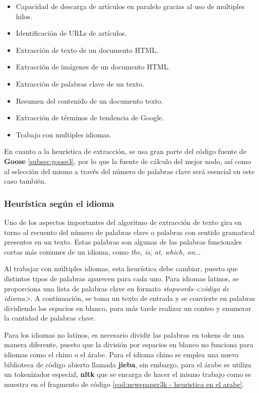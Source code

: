 \begin{itemize}
  \item Capacidad de descarga de artículos en paralelo gracias al uso de multiples hilos.
  \item Identificación de URLs de artículos.
  \item Extracción de texto de un documento HTML.
  \item Extracción de imágenes de un documento HTML.
  \item Extracción de palabras clave de un texto.
  \item Resumen del contenido de un documento texto.
  \item Extracción de términos de tendencia de Google.
  \item Trabajo con multiples idiomas.
\end{itemize}

En cuanto a la heurística de extracción, se usa gran parte del código fuente de \textbf{Goose} 
\ref{subsec:goose3}, por lo que la fuente de cálculo del mejor nodo, así como al selección del mismo a 
través del número de palabras clave será esencial en este caso también.

\subsubsection{Heurística según el idioma}
\label{subsubsec:heuristica segun el idioma}

Uno de los aspectos importantes del algoritmo de extracción de texto gira en torno al recuento del número 
de palabras clave o palabras con sentido gramatical presentes en un texto. Estas palabras son algunas de 
las palabras funcionales cortas más comunes de un idioma, como \emph{the, is, at, which, on}... 

Al trabajar con múltiples idiomas, esta heurística debe cambiar, puesto que distintos tipos de palabras
aparecen para cada uno. Para idiomas latinos, se proporciona una lista de palabras clave en formato 
\emph{stopwords-<código de idioma>}. A continuación, se toma un texto de entrada y se convierte en palabras 
dividiendo los espacios en blanco, para más tarde realizar un conteo y enumerar la cantidad de palabras 
clave.

Para los idiomas no latinos, es necesario dividir las palabras en tokens de una manera diferente, puesto
que la división por espacios en blanco no funciona para idiomas como el chino o el árabe. Para el idioma
chino se emplea una nueva biblioteca de código abierto llamada \textbf{jieba}, sin embargo, para el árabe
se utiliza un tokenizador especial, \textbf{nltk} que se encarga de hacer el mismo trabajo como se muestra 
en el fragmento de código \ref{cod:newspaper3k - heuristica en el arabe}.

